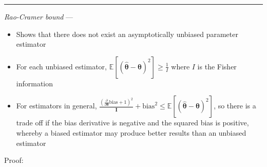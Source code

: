 {\color{lightgray}\hrule height 0.001mm}

\emph{Rao-Cramer bound} --- 
\begin{itemize}
    \item Shows that there does not exist an asymptotically unbiased parameter estimator
    \item For each unbiased estimator, $\mathbb{E} [ ( \hat{\boldsymbol{\theta}} - \boldsymbol{\theta} )^2 ] \geq \frac{1}{I}$ where $I$ is the Fisher information
    \item For estimators in general, $\frac{(\frac{\partial}{\partial \boldsymbol{\theta}} \textrm{bias} + 1)^2}{\boldsymbol{I}} + \textrm{bias}^2 \leq \mathbb{E}[(\hat{\boldsymbol{\theta}}-\boldsymbol{\theta})^2]$, so there is a trade off if the bias derivative is negative and the squared bias is positive, whereby a biased estimator may produce better results than an unbiased estimator
\end{itemize}
Proof: 
